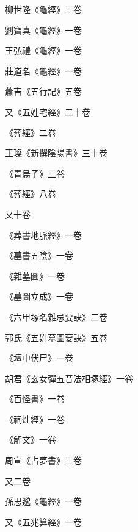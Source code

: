 \begin{pinyinscope}
 柳世隆《龜經》三卷



 劉寶真《龜經》一卷



 王弘禮《龜經》一卷



 莊道名《龜經》一卷



 蕭吉《五行記》五卷



 又《五姓宅經》二十卷



 《葬經》二卷



 王璨《新撰陰陽書》三十卷



 《青烏子》三卷



 《葬經》八卷



 又十卷



 《葬書地脈經》一卷



 《墓書五陰》一卷



 《雜墓圖》一卷



 《墓圖立成》一卷



 《六甲塚名雜忌要訣》二卷



 郭氏《五姓墓圖要訣》五卷



 《壇中伏尸》一卷



 胡君《玄女彈五音法相塚經》一卷



 《百怪書》一卷



 《祠灶經》一卷



 《解文》一卷



 周宣《占夢書》三卷



 又二卷



 孫思邈《龜經》一卷



 又《五兆算經》一卷




\end{pinyinscope}
